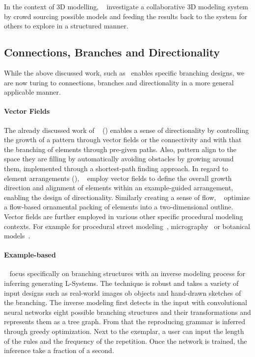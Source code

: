 In the context of 3D modelling, \citeauthor*{talton_2009_emw}~\cite{talton_2009_emw} investigate a collaborative 3D modeling system by crowd sourcing possible models and feeding the results back to the system for others to explore in a structured manner. 

\subsection{Connections, Branches and Directionality}
\label{subsec:analysis_connections_branches_and_directionality}


While the above discussed work, such as~\cite{yu_2012_ans,xu_2009_mcc, merrell_2010_ecs}  enables specific branching designs, we are now turing to connections, branches and directionality in a more general applicable manner.

\paragraph*{Vector Fields}
The already discussed work of \citeauthor*{gieseke_2017_ooo}~\cite{gieseke_2017_ooo} () enables a sense of directionality by controlling the growth of a pattern through vector fields or the connectivity and with that the branching of elements through pre-given paths. Also, pattern align to the space they are filling by automatically avoiding obstacles by growing around them, implemented through a shortest-path finding approach. In regard to element arrangements (), \citeauthor*{ijiri_2008_aeb}~\cite{ijiri_2008_aeb} employ vector fields to define the overall growth direction and alignment of elements within an example-guided arrangement, enabling the design of directionality. Similarly creating a sense of flow, \citeauthor*{saputra_2017_ffo}~\cite{saputra_2017_ffo} optimize a flow-based ornamental packing of elements into a two-dimensional outline. Vector fields are further employed in various other specific procedural modeling contexts. For example for procedural street modeling~\cite{chen_2008_ips}, micrography~\cite{maharik_2011_dm} or botanical models~\cite{xu_2015_ptm}.

\paragraph*{Example-based}
\citeauthor*{guo_2020_ipm}~\cite{guo_2020_ipm} focus specifically on branching structures with an inverse modeling process for inferring generating L-Systems. The technique is robust and takes a variety of input designs such as real-world images ob objects and hand-drawn sketches of the branching. The inverse modeling first detects in the input with convolutional neural networks eight possible branching structures and their transformations and represents them as a tree graph. From that the reproducing grammar is inferred through greedy optimization. Next to the exemplar, a user can input the length of the rules and the frequency of the repetition. Once the network is trained, the inference take a fraction of a second.

